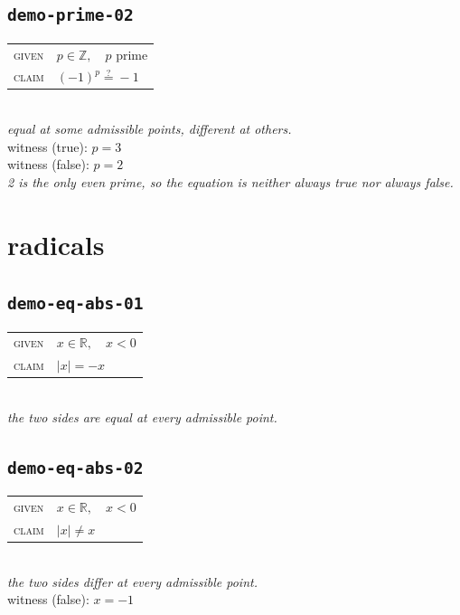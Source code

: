 \documentclass[11pt]{article}
\begin{document}
\subsection*{\texttt{demo-prime-02}}
\begin{tabular}{@{}l@{\quad}l@{}}
\textsc{given} & $p \in \mathbb{Z},\quad p \text{ prime}$ \\[4pt]
\textsc{claim} & $\displaystyle \left(-1\right)^{p} \overset{?}{=} -1$ \\
\end{tabular}\\[2pt]
{\small\emph{equal at some admissible points, different at others.}}\\
{\footnotesize\color{gray}witness (true): $p = 3$}\\
{\footnotesize\color{gray}witness (false): $p = 2$}\\
\emph{2 is the only even prime, so the equation is neither always true nor always false.}\\

\section*{radicals}
\subsection*{\texttt{demo-eq-abs-01}}
\begin{tabular}{@{}l@{\quad}l@{}}
\textsc{given} & $x \in \mathbb{R},\quad x < 0$ \\[4pt]
\textsc{claim} & $\displaystyle \left|x\right| = -x$ \\
\end{tabular}\\[2pt]
{\small\emph{the two sides are equal at every admissible point.}}\\

\subsection*{\texttt{demo-eq-abs-02}}
\begin{tabular}{@{}l@{\quad}l@{}}
\textsc{given} & $x \in \mathbb{R},\quad x < 0$ \\[4pt]
\textsc{claim} & $\displaystyle \left|x\right| \neq x$ \\
\end{tabular}\\[2pt]
{\small\emph{the two sides differ at every admissible point.}}\\
{\footnotesize\color{gray}witness (false): $x = -1$}\\
\end{document}
